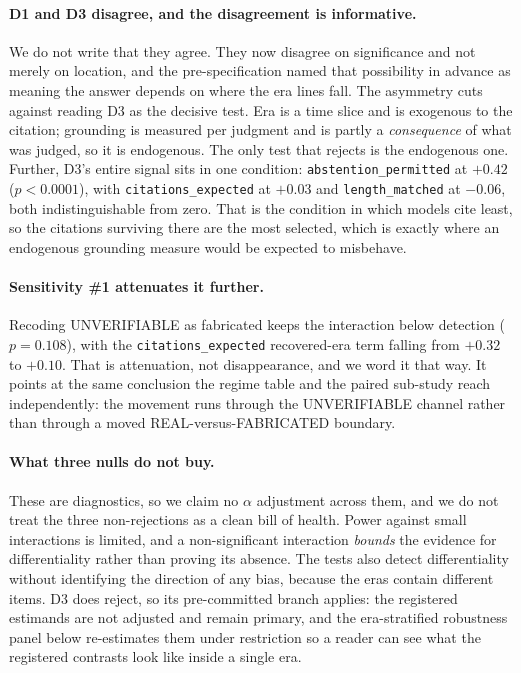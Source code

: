 \paragraph{D1 and D3 disagree, and the disagreement is informative.}
We do not write that they agree. They now disagree on significance and not merely
on location, and the pre-specification named that possibility in advance as
meaning the answer depends on where the era lines fall. The asymmetry cuts
against reading D3 as the decisive test. Era is a time slice and is exogenous to
the citation; grounding is measured per judgment and is partly a
\emph{consequence} of what was judged, so it is endogenous. The only test that
rejects is the endogenous one. Further, D3's entire signal sits in one condition:
\texttt{abstention\_permitted} at $+0.42$ ($p < 0.0001$), with
\texttt{citations\_expected} at $+0.03$ and \texttt{length\_matched} at $-0.06$,
both indistinguishable from zero. That is the condition in which models cite
least, so the citations surviving there are the most selected, which is exactly
where an endogenous grounding measure would be expected to misbehave.

\paragraph{Sensitivity \#1 attenuates it further.}
Recoding UNVERIFIABLE as fabricated keeps the interaction below detection
($p = 0.108$), with the \texttt{citations\_expected} recovered-era term falling
from $+0.32$ to $+0.10$. That is attenuation, not disappearance, and we word it
that way. It points at the same conclusion the regime table and the paired
sub-study reach independently: the movement runs through the UNVERIFIABLE
channel rather than through a moved REAL-versus-FABRICATED boundary.

\paragraph{What three nulls do not buy.}
These are diagnostics, so we claim no $\alpha$ adjustment across them, and we do
not treat the three non-rejections as a clean bill of health. Power against small
interactions is limited, and a non-significant interaction \emph{bounds} the
evidence for differentiality rather than proving its absence. The tests also
detect differentiality without identifying the direction of any bias, because the
eras contain different items. D3 does reject, so its pre-committed branch
applies: the registered estimands are not adjusted and remain primary, and the
era-stratified robustness panel below re-estimates them under restriction so a
reader can see what the registered contrasts look like inside a single era.

